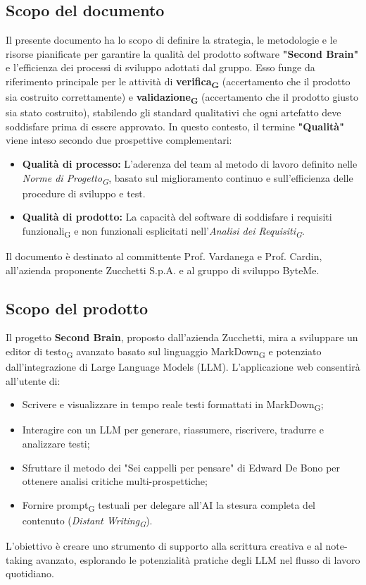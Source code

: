 \documentclass[11pt,a4paper]{article}
\newcommand{\gls}[1]{#1\textsubscript{G}}
\begin{document}
\subsection{Scopo del documento}
Il presente documento ha lo scopo di definire la strategia, le metodologie e le risorse pianificate per garantire la qualità del prodotto software \textbf{"Second Brain"} e l'efficienza dei processi di sviluppo adottati dal gruppo. Esso funge da riferimento principale per le attività di \textbf{\gls{verifica}} (accertamento che il prodotto sia costruito correttamente) e \textbf{\gls{validazione}} (accertamento che il prodotto giusto sia stato costruito), stabilendo gli standard qualitativi che ogni artefatto deve soddisfare prima di essere approvato.
In questo contesto, il termine \textbf{"Qualità"} viene inteso secondo due prospettive complementari:
\begin{itemize}
    \item \textbf{Qualità di processo:} L'aderenza del team al metodo di lavoro definito nelle \textit{\gls{Norme di Progetto}}, basato sul miglioramento continuo e sull'efficienza delle procedure di sviluppo e test.
    \item \textbf{Qualità di prodotto:} La capacità del software di soddisfare i \gls{requisiti funzionali} e non funzionali esplicitati nell'\textit{\gls{Analisi dei Requisiti}}.
\end{itemize}
Il documento è destinato al committente Prof. Vardanega e Prof. Cardin, all'azienda proponente Zucchetti S.p.A. e al gruppo di sviluppo ByteMe.

\subsection{Scopo del prodotto}
Il progetto \textbf{Second Brain}, proposto dall'azienda Zucchetti, mira a sviluppare un \gls{editor di testo} avanzato basato sul linguaggio \gls{MarkDown} e potenziato dall'integrazione di Large Language Models (LLM).
L'applicazione web consentirà all'utente di:
\begin{itemize}
    \item Scrivere e visualizzare in tempo reale testi formattati in \gls{MarkDown};
    \item Interagire con un LLM per generare, riassumere, riscrivere, tradurre e analizzare testi;
    \item Sfruttare il metodo dei "Sei cappelli per pensare" di Edward De Bono per ottenere analisi critiche multi-prospettiche;
    \item Fornire \gls{prompt} testuali per delegare all'AI la stesura completa del contenuto (\textit{\gls{Distant Writing}}).
\end{itemize}
L'obiettivo è creare uno strumento di supporto alla scrittura creativa e al note-taking avanzato, esplorando le potenzialità pratiche degli LLM nel flusso di lavoro quotidiano.
\end{document}
